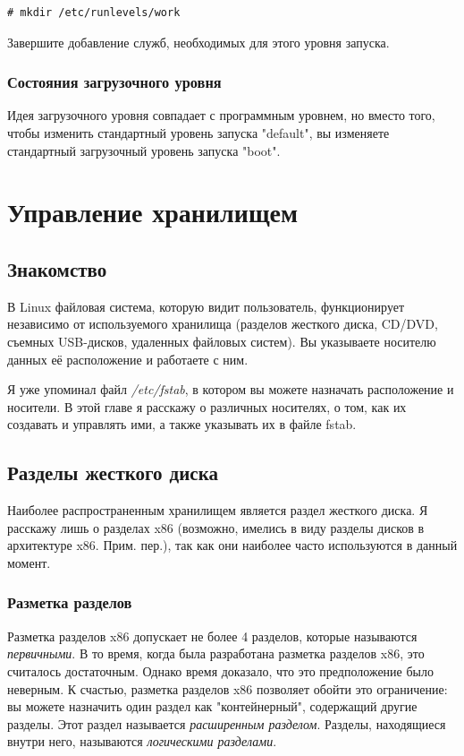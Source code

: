\documentclass[10pt]{book}
\begin{document}
\begin{tcolorbox} 
\begin{lstlisting}
# mkdir /etc/runlevels/work
\end{lstlisting}
\end{tcolorbox}

Завершите добавление служб, необходимых для этого уровня запуска.

\subsection{Состояния загрузочного уровня}
Идея загрузочного уровня совпадает с программным уровнем, но вместо того, чтобы изменить стандартный уровень запуска "default"{}, вы изменяете стандартный загрузочный уровень запуска "boot"{}.

\newpage

\pagestyle{headings} 

\chapter{Управление хранилищем}

\section{Знакомство}

В Linux файловая система, которую видит пользователь, функционирует независимо от используемого хранилища (разделов жесткого диска, CD/DVD, съемных USB-дисков, удаленных файловых систем). Вы указываете носителю данных её расположение и работаете с ним.

Я уже упоминал файл \textit{/etc/fstab}, в котором вы можете назначать расположение и носители. В этой главе я расскажу о различных носителях, о том, как их создавать и управлять ими, а также указывать их в файле fstab.

\section{Разделы жесткого диска}
Наиболее распространенным хранилищем является раздел жесткого диска. Я расскажу лишь о разделах x86 (возможно, имелись в виду разделы дисков в архитектуре x86. Прим. пер.), так как они наиболее часто используются в данный момент.

\subsection{Разметка разделов}
Разметка разделов x86 допускает не более 4 разделов, которые называются \textit{первичными}. В то время, когда была разработана разметка разделов x86, это считалось достаточным. Однако время доказало, что это предположение было неверным. К счастью, разметка разделов x86 позволяет обойти это ограничение: вы можете назначить один раздел как "контейнерный"{}, содержащий другие разделы. Этот раздел называется \textit{расширенным разделом}. Разделы, находящиеся внутри него, называются \textit{логическими разделами}.
\end{document}
